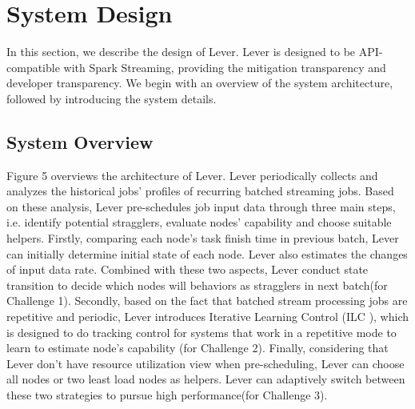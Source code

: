 \documentclass[10pt,conference,compsocconf,letterpaper]{IEEEtran}
\begin{document}
\section{System Design}

  In this section, we describe the design of Lever. Lever is designed to be API-compatible with Spark Streaming, providing the mitigation transparency and developer transparency. We begin with an overview of the system architecture, followed by introducing the system details.

\subsection{System Overview}

  Figure 5 overviews the architecture of Lever. Lever periodically collects and analyzes the historical jobs' profiles of recurring batched streaming jobs. Based on these analysis, Lever pre-schedules job input data through three main steps, i.e. identify potential stragglers, evaluate nodes' capability and choose suitable helpers. Firstly, comparing each node's task finish time in previous batch, Lever can initially determine initial state of each node. Lever also estimates the changes of input data rate. Combined with these two aspects, Lever conduct state transition to decide which nodes will behaviors as stragglers in next batch(for Challenge 1). Secondly, based on the fact that batched stream processing jobs are repetitive and periodic, Lever introduces Iterative Learning Control (ILC \cite{Arimoto}), which is designed to do tracking control for systems that work in a repetitive mode to learn to estimate node's capability (for Challenge 2). Finally, considering that Lever don't have resource utilization view when pre-scheduling, Lever can choose all nodes or two least load nodes as helpers. Lever can adaptively switch between these two strategies to pursue high performance(for Challenge 3).
\end{document}
